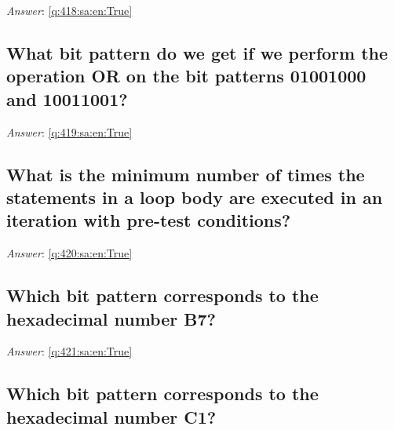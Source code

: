 \documentclass[a4paper,11pt,oneside]{article}
\begin{document}
\begin{sloppypar}
\textit{Answer}: \autoref{q:418:sa:en:True}



\subsection{What bit pattern do we get if we perform the operation OR on the bit patterns 01001000 and 10011001?}

\label{q:419:sa:en:False}

\vspace{2cm}

\noindent\makebox[\textwidth]{\hrulefill}

\vspace{1cm}

\textit{Answer}: \autoref{q:419:sa:en:True}



\subsection{What is the minimum number of times the statements in a loop body are executed in an iteration with pre-test conditions?}

\label{q:420:sa:en:False}

\vspace{2cm}

\noindent\makebox[\textwidth]{\hrulefill}

\vspace{1cm}

\textit{Answer}: \autoref{q:420:sa:en:True}



\subsection{Which bit pattern corresponds to the hexadecimal number B7?}

\label{q:421:sa:en:False}

\vspace{2cm}

\noindent\makebox[\textwidth]{\hrulefill}

\vspace{1cm}

\textit{Answer}: \autoref{q:421:sa:en:True}



\subsection{Which bit pattern corresponds to the hexadecimal number C1?}


\end{sloppypar}
\end{document}
